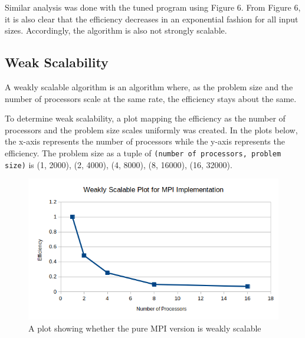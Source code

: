 \documentclass{article}
\begin{document}
Similar analysis was done with the tuned program using Figure 6. From Figure 6, it is also clear that the efficiency decreases in an exponential fashion for all input sizes. Accordingly, the algorithm is also not strongly scalable.

\subsection{Weak Scalability}
A weakly scalable algorithm is an algorithm where, as the problem size and the number of processors scale at the same rate, the efficiency stays about the same.

To determine weak scalability, a plot mapping the efficiency as the number of processors and the problem size scales uniformly was created. In the plots below, the x-axis represents the number of processors while the y-axis represents the efficiency. The problem size as a tuple of \texttt{(number of processors, problem size)} is {(1, 2000), (2, 4000), (4, 8000), (8, 16000), (16, 32000)}.

\begin{figure}[H]
	\begin{center}
		\hspace*{-0.5cm}                                                           
  		\includegraphics[scale=0.7]{Report_Assets/weakscalempi.png}
  	\end{center}
  	\caption{A plot showing whether the pure MPI version is weakly scalable}
\end{figure}
\end{document}
